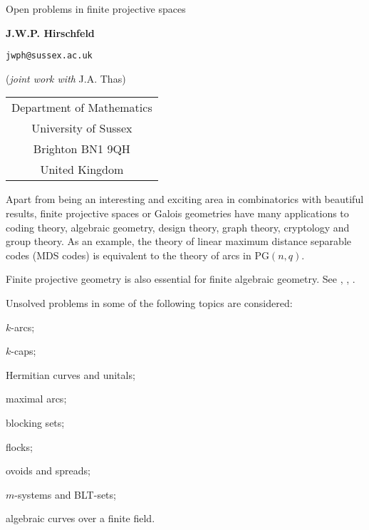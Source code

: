 \documentclass[a4paper]{article}
\begin{document}
\begin{center}

{\LARGE Open problems in finite projective spaces}

\vspace{4mm}

\textbf{\large J.W.P. Hirschfeld} %

\texttt{jwph@sussex.ac.uk} %

\vspace{2mm}
(\emph{joint work with} J.A. Thas)

\vspace{3mm}
\begin{tabular}{c}
Department  of Mathematics\\
University  of Sussex\\
Brighton BN1 9QH\\
United Kingdom
\end{tabular}
\end{center}

Apart from being an interesting and exciting area in combinatorics with
beautiful results, finite projective spaces or Galois geometries have many
applications to coding theory, algebraic geometry, design theory, graph
theory, cryptology and group theory. As an example, the theory of linear
maximum distance separable codes (MDS codes) is equivalent to the theory of
arcs in $\mathrm{PG}(n,q)$. 

Finite projective geometry is also essential for finite algebraic geometry.
See \cite{j1}, \cite{j2},  \cite{j3}.

Unsolved problems in some of the following topics are considered: 
\begin{compactenum}[(1)]
\item $k$-arcs;

\item $k$-caps;


\item Hermitian curves and unitals;

\item maximal arcs;

\item blocking sets;

\item flocks;

\item ovoids and spreads;

\item $m$-systems and BLT-sets;
\item algebraic curves over a finite field.
\end{compactenum}
\end{document}

